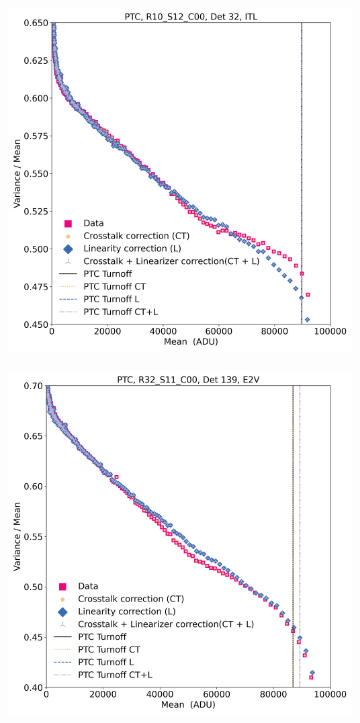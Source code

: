 \begin{figure}[!htb]
     \centering
     \begin{subfigure}[b]{0.49\textwidth}
         \centering
         \includegraphics[width=\textwidth]{Figures/Variance_Mean_vs_Mean32.png}
     \end{subfigure}
     \hfill
     \begin{subfigure}[b]{0.49\textwidth}
         \centering
         \includegraphics[width=\textwidth]{Figures/Variance_Mean_vs_Mean139.png}

\end{subfigure}
\end{figure}
